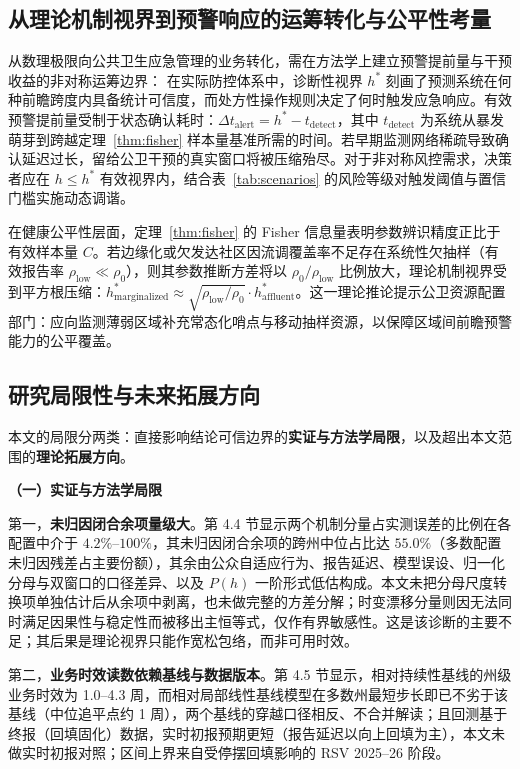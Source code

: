 \documentclass[11pt,a4paper]{article}
\theoremstyle{plain}
\theoremstyle{definition}
\begin{document}
\subsection{从理论机制视界到预警响应的运筹转化与公平性考量}\label{sec:operational_translation}

从数理极限向公共卫生应急管理的业务转化，需在方法学上建立预警提前量与干预收益的非对称运筹边界\citep{parag2025asymmetric}：
在实际防控体系中，诊断性视界 $h^*$ 刻画了预测系统在何种前瞻跨度内具备统计可信度，而处方性操作规则决定了何时触发应急响应。有效预警提前量受制于状态确认耗时：$\Delta t_{\text{alert}} = h^* - t_{\text{detect}}$，其中 $t_{\text{detect}}$ 为系统从暴发萌芽到跨越定理~\ref{thm:fisher} 样本量基准所需的时间。若早期监测网络稀疏导致确认延迟过长，留给公卫干预的真实窗口将被压缩殆尽。对于非对称风控需求，决策者应在 $h \le h^*$ 有效视界内，结合表~\ref{tab:scenarios} 的风险等级对触发阈值与置信门槛实施动态调谐。

在健康公平性层面，定理~\ref{thm:fisher} 的 Fisher 信息量表明参数辨识精度正比于有效样本量 $C$。若边缘化或欠发达社区因流调覆盖率不足存在系统性欠抽样（有效报告率 $\rho_{\text{low}} \ll \rho_0$），则其参数推断方差将以 $\rho_0/\rho_{\text{low}}$ 比例放大，理论机制视界受到平方根压缩：$h^*_{\text{marginalized}} \approx \sqrt{\rho_{\text{low}}/\rho_0} \cdot h^*_{\text{affluent}}$。这一理论推论提示公卫资源配置部门：应向监测薄弱区域补充常态化哨点与移动抽样资源，以保障区域间前瞻预警能力的公平覆盖。

\subsection{研究局限性与未来拓展方向}

本文的局限分两类：直接影响结论可信边界的\textbf{实证与方法学局限}，以及超出本文范围的\textbf{理论拓展方向}。

\noindent\textbf{（一）实证与方法学局限}

第一，\textbf{未归因闭合余项量级大}。第 4.4 节显示两个机制分量占实测误差的比例在各配置中介于 $4.2\%$--$100\%$，其未归因闭合余项的跨州中位占比达 $55.0\%$（多数配置未归因残差占主要份额），其余由公众自适应行为、报告延迟、模型误设、归一化分母与双窗口的口径差异、以及 $P(h)$ 一阶形式低估构成。本文未把分母尺度转换项单独估计后从余项中剥离，也未做完整的方差分解；时变漂移分量则因无法同时满足因果性与稳定性而被移出主恒等式，仅作有界敏感性。这是该诊断的主要不足；其后果是理论视界只能作宽松包络，而非可用时效。

第二，\textbf{业务时效读数依赖基线与数据版本}。第 4.5 节显示，相对持续性基线的州级业务时效为 1.0--4.3 周，而相对局部线性基线模型在多数州最短步长即已不劣于该基线（中位追平点约 1 周），两个基线的穿越口径相反、不合并解读；且回测基于终报（回填固化）数据，实时初报预期更短（报告延迟以向上回填为主），本文未做实时初报对照；区间上界来自受停摆回填影响的 RSV 2025--26 阶段。
\end{document}
